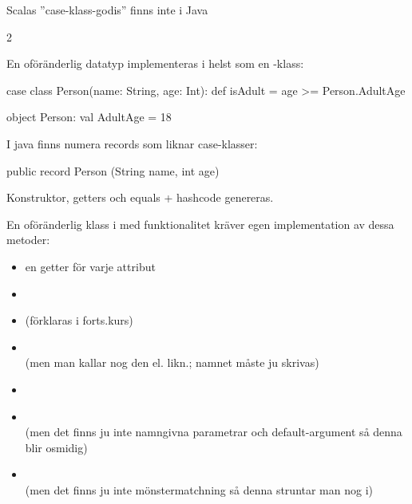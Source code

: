\begin{Slide}{Scalas ''case-klass-godis'' finns inte i Java}
\ifkompendium\else
\SlideFontTiny\vspace{-0.5em}\begin{multicols}{2}
\fi 

En oföränderlig datatyp implementeras i  helst som en \pause{}-klass:

\begin{CodeSmall}[basicstyle=\ttfamily\SlideFontSize{5.7}{6.7}]
case class Person(name: String, age: Int):
  def isAdult = age >= Person.AdultAge

object Person:
  val AdultAge = 18
\end{CodeSmall}

\pause

I java finns numera records som liknar case-klasser:

\begin{CodeSmall}[language=Java,basicstyle=\ttfamily\SlideFontSize{5}{6}]
public record Person (String name, int age) {}
\end{CodeSmall}
Konstruktor, getters och equals + hashcode genereras.

\ifkompendium\else\columnbreak\fi

\noindent En oföränderlig klass i  med  funktionalitet kräver egen implementation av dessa metoder:
\ifkompendium\else\vspace{-0.25em}\fi
\begin{itemize}
\item en getter för varje attribut
\item {}
\item {} (förklaras i forts.kurs)
\item {} \\ (men man kallar nog den  el. likn.; namnet måste ju skrivas)
\item {}
\item {} \\ (men det finns ju inte namngivna parametrar och default-argument så denna blir osmidig)
\item {} \\ (men det finns ju inte mönstermatchning så denna struntar man nog i)
\end{itemize}

\ifkompendium\else
\end{multicols}
\fi
\end{Slide}




